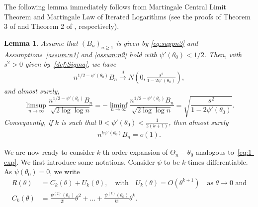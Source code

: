 \documentclass[12pt]{amsart}
\theoremstyle{plain}
\newtheorem{lemma}[theorem]{Lemma}
\theoremstyle{remark}
\numberwithin{equation}{section}
\begin{document}
The following lemma immediately follows from Martingale Central Limit Theorem and Martingale Law of Iterated Logarithms (see the proofs of Theorem 3 of \cite{major1973limit} and Theorem 2 of \cite{krasulina1996estimate}, respectively). 
\begin{lemma} Assume that $\left(B_n\right)_{n\geq 1}$ is given by \eqref{eq:suppn2} and Assumptions~\ref{assum:n1} and \ref{assum:n2} hold with $\psi'(\theta_0) < 1/2$. Then, with $s^2>0$ given by~\eqref{def:Sigma}, we have
\begin{align}\label{eq:suppnn1}
   n^{1/2 - \psi'(\theta_0)}B_n \stackrel{d}{\to} N\left(0, \frac{s^2}{1-2\psi'(\theta_0)}\right),
\end{align}
and almost surely,
\begin{equation}\label{eq:suppnn2}
   \limsup_{n\to\infty}\frac{n^{1/2 - \psi'(\theta_0)}B_n}{\sqrt{2\log\log n}} \nonumber%
   =-\liminf_{n\to\infty}\frac{n^{1/2 - \psi'(\theta_0)}B_n}{\sqrt{2\log\log n}} = \sqrt{\frac{s^2}{1-2\psi'(\theta_0)}}.
\end{equation}
Consequently, if $k$ is such that $0 < \psi'(\theta_0) < \frac{1}{2(k+1)}$, then almost surely
\begin{align}\label{eq:supp7n}
   n^{k\psi'(\theta_0)}B_n = o(1).
\end{align}
\end{lemma}

We are now ready to consider $k$-th order expansion of $\Theta_n-\theta_0$ analogous to~\eqref{eq:1-exp}. We first introduce some notations. Consider  $\psi$ to be $k$-times differentiable. As $\psi(\theta_0) = 0$, we write 
\begin{align}\label{eq:supp0}
   R(\theta) &= C_{k}(\theta) + {U_{k}(\theta)}, \quad \text{with} \quad {U_{k}(\theta)} = O(\theta^{k+1}) \quad \text{as $\theta\to 0$ and} \nonumber\\
   C_{k}(\theta) &= \frac{\psi^{(2)}(\theta_0)}{2!}\theta^2 + \ldots + \frac{\psi^{(k)}(\theta_0)}{k!}\theta^{k}.
\end{align}
\end{document}
